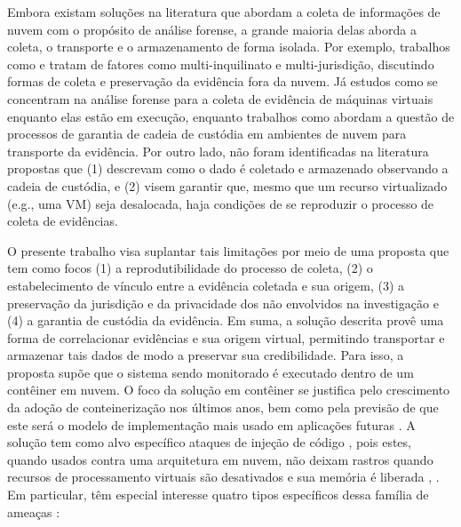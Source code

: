 \documentclass[conference]{IEEEtran}
\newcommand{\marcosT}[1]{{\color{red}{TODO: #1}}}
\begin{document}
%
Embora existam soluções na literatura que abordam a coleta de informações de nuvem com o propósito de análise forense, a grande maioria delas aborda a coleta, o transporte e o armazenamento de forma isolada.
%
Por exemplo, trabalhos como \cite{Dykstra_FROST:2013} e \cite{Reichert_Auto_acquisition:2015} tratam de fatores como multi-inquilinato e multi-jurisdição, discutindo formas de coleta e preservação da evidência fora da nuvem.
%
Já estudos como \cite{George_DF2CE:2012} se concentram na análise forense para a coleta de evidência de máquinas virtuais enquanto elas estão em execução, enquanto trabalhos como \cite{Sang_Log_approach:2013} abordam a questão de processos de garantia de cadeia de custódia em ambientes de nuvem para transporte da evidência.
%
%
%
Por outro lado, não foram identificadas na literatura propostas que (1) descrevam como o dado é coletado e armazenado observando a cadeia de custódia, e (2) visem garantir que, mesmo que um recurso virtualizado (e.g., uma VM) seja desalocada, haja condições de se reproduzir o processo de coleta de evidências.



%
O presente trabalho visa suplantar tais limitações por meio de uma proposta que tem como focos (1) a reprodutibilidade do processo de coleta, (2) o estabelecimento de vínculo entre a evidência coletada e sua origem, (3) a preservação da jurisdição e da privacidade dos não envolvidos na investigação e (4) a garantia de custódia da evidência.
%
Em suma, a solução descrita provê uma forma de correlacionar evidências e sua origem virtual, permitindo transportar e armazenar tais dados de modo a preservar sua credibilidade.
%
Para isso, a proposta supõe que o sistema sendo monitorado é executado dentro de um contêiner em nuvem. 
%
O foco da solução em contêiner se justifica pelo crescimento da adoção de conteinerização nos últimos anos, bem como pela previsão de que este será o modelo de implementação mais usado em aplicações futuras \cite{Piraghaj_Container_Cloud_Computing:2016}.
%
A solução tem como alvo específico ataques de injeção de código \cite{Case_Memory_Forensics:2014}, pois estes, quando usados contra uma arquitetura em nuvem, não deixam rastros quando recursos de processamento virtuais são desativados e sua memória é liberada \cite{Vomel_Memory_Acquisition:2013}, \cite{Case_Memory_Forensics:2014}.
%
Em particular, têm especial interesse quatro tipos específicos dessa família de ameaças \cite{Case_Memory_Forensics:2014}:
\end{document}
